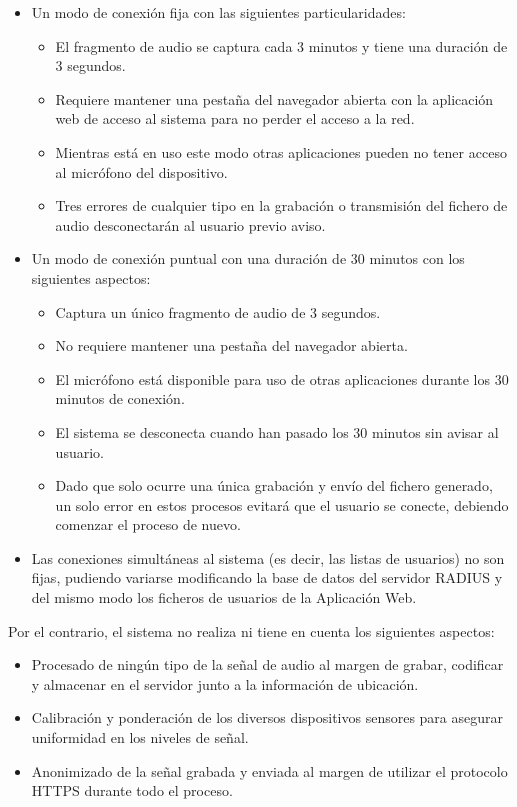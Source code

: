 \begin{itemize}
\item Un modo de conexión fija con las siguientes particularidades:
	\begin{itemize}
	\item El fragmento de audio se captura cada 3 minutos y tiene una duración de 3 segundos.
	\item Requiere mantener una pestaña del navegador abierta con la aplicación web de acceso al sistema para no perder el acceso a la red.
	\item Mientras está en uso este modo otras aplicaciones pueden no tener acceso al micrófono del dispositivo.
	\item Tres errores de cualquier tipo en la grabación o transmisión del fichero de audio desconectarán al usuario previo aviso.
	\end{itemize}
\item Un modo de conexión puntual con una duración de 30 minutos con los siguientes aspectos:
	\begin{itemize}
	\item Captura un único fragmento de audio de 3 segundos.
	\item No requiere mantener una pestaña del navegador abierta.
	\item El micrófono está disponible para uso de otras aplicaciones durante los 30 minutos de conexión.
	\item El sistema se desconecta cuando han pasado los 30 minutos sin avisar al usuario.
	\item Dado que solo ocurre una única grabación y envío del fichero generado, un solo error en estos procesos evitará que el usuario se conecte, debiendo comenzar el proceso de nuevo.
	\end{itemize}
\item Las conexiones simultáneas al sistema (es decir, las listas de usuarios) no son fijas, pudiendo variarse modificando la base de datos del servidor RADIUS y del mismo modo los ficheros de usuarios de la Aplicación Web.
\end{itemize}

Por el contrario, el sistema no realiza ni tiene en cuenta los siguientes aspectos:

\begin{itemize}
\item Procesado de ningún tipo de la señal de audio al margen de grabar, codificar y almacenar en el servidor junto a la información de ubicación.
\item Calibración y ponderación de los diversos dispositivos sensores para asegurar uniformidad en los niveles de señal.
\item Anonimizado de la señal grabada y enviada al margen de utilizar el protocolo HTTPS durante todo el proceso.

\end{itemize}

